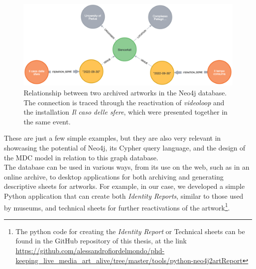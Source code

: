 \begin{figure}[!h]
    \centering
    \includegraphics[width=\linewidth]{chapters/4-MDC_model_application/image/neo4j-event.png}
    \caption{Relationship between two archived artworks in the Neo4j database. The connection is traced through the reactivation of \textit{videoloop} and the installation \textit{Il caso delle sfere}, which were presented together in the same event.}
    \label{fig:c4-neo4j-event}
\end{figure}

These are just a few simple examples, but they are also very relevant in showcasing the potential of Neo4j, its Cypher query language, and the design of the MDC model in relation to this graph database.\\
The database can be used in various ways, from its use on the web, such as in an online archive, to desktop applications for both archiving and generating descriptive sheets for artworks. For example, in our case, we developed a simple Python application that can create both \textit{Identity Reports}, similar to those used by museums, and technical sheets for further reactivations of the artwork\footnote{The python code for creating the \textit{Identity Report} or Technical sheets can be found in the GitHub repository of this thesis, at the link \url{https://github.com/alessandrofiordelmondo/phd-keeping_live_media_art_alive/tree/master/tools/python-neo4j2artReport}}. 

